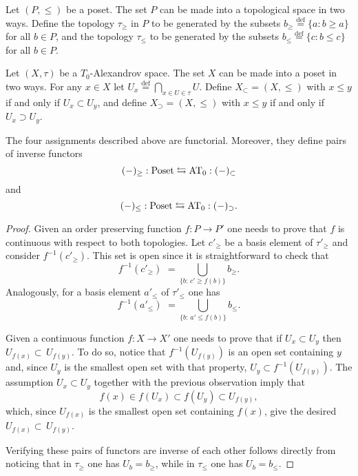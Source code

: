 \documentclass[thesis.tex]{subfiles}
\begin{document}
\begin{definition}
Let $(P,\leq)$ be a poset. The set $P$ can be made into a topological space in two ways.
Define the topology $\tau_\geq$ in $P$ to be generated by the subsets $b_\geq\stackrel{\mathrm{def}}{=}\{a:b\geq a\}$ for all $b\in P$, and the topology $\tau_\leq$ to be generated by the subsets $b_\leq\stackrel{\mathrm{def}}{=}\{c:b\leq c\}$ for all $b\in P$.\vspace*{6pt}

Let $(X,\tau)$ be a $T_0$-Alexandrov space. The set $X$ can be made into a poset in two ways.
For any $x\in X$ let $U_x\stackrel{\mathrm{def}}{=}\bigcap_{x\in U\in\tau}U$.
Define $X_\subset=(X,\leq)$ with $x\leq y$ if and only if $U_x\subset U_y$, and define $X_\supset=(X,\leq)$ with $x\leq y$ if and only if $U_x\supset U_y$.
\end{definition}

\begin{lemma}\label{from posets to A spaces and back}
The four assignments described above are functorial. Moreover, they define pairs of inverse functors
$$(-)_{\geq}:\Poset\leftrightarrows\AT_0:(-)_\subset$$
and
$$(-)_{\leq}:\Poset\leftrightarrows\AT_0:(-)_\supset.$$
\begin{proof}
Given an order preserving function $f:P\to P'$ one needs to prove that $f$ is continuous with respect to both topologies. Let $c'_\geq$ be a basis element of $\tau'_\geq$ and consider $f^{-1}(c'_\geq)$. This set is open since it is straightforward to check that
$$f^{-1}(c'_\geq)\,\,=\!\!\!\bigcup_{\{b:\,c'\geq f(b)\!\}}\!\!b_\geq.$$
Analogously, for a basis element $a'_\leq$ of $\tau'_\leq$ one has
$$f^{-1}(a'_\leq)\,\,=\!\!\!\bigcup_{\{b:\,a'\leq f(b)\!\}}\!\!b_\leq.$$

Given a continuous function $f:X\to X'$ one needs to prove that if $U_x\subset U_y$ then $U_{f(x)}\subset\, U_{f(y)}$. To do so, notice that $f^{-1}(U_{f(y)})$ is an open set containing $y$ and, since $U_y$ is the smallest open set with that property, $U_y\subset f^{-1}(U_{f(y)})$. The assumption $U_x\subset U_y$ together with the previous observation imply that
$$f(x)\in f(U_x)\subset f(U_y)\subset U_{f(y)},$$
which, since $U_{f(x)}$ is the smallest open set containing $f(x)$, give the desired $U_{f(x)}\subset\, U_{f(y)}$.

Verifying these pairs of functors are inverse of each other follows directly from noticing that in $\tau_\geq$ one has $U_b=b_\geq$, while in $\tau_\leq$ one has $U_b=b_\leq$.
\end{proof}
\end{lemma}
\end{document}
